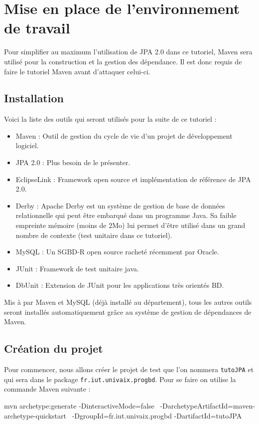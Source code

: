\documentclass[a4paper,11pt]{article}
\begin{document}
\section{Mise en place de l'environnement de travail}
Pour simplifier au maximum l'utilisation de JPA 2.0 dans ce tutoriel, Maven sera utilisé pour la construction et la 
gestion des dépendance. Il est donc requis de faire le tutoriel Maven avant d'attaquer celui-ci.

\subsection{Installation}
Voici la liste des outils qui seront utilisés pour la suite de ce tutoriel : 
\begin{itemize}
\item Maven : Outil de gestion du cycle de vie d'un projet de développement logiciel.
\item JPA 2.0 : Plus besoin de le présenter.
\item EclipseLink : Framework open source et implémentation de référence de JPA 2.0.
\item Derby : Apache Derby est un système de gestion de base de données relationnelle qui peut être embarqué dans un programme Java. 
      Sa faible empreinte mémoire (moins de 2Mo) lui permet d'être utilisé dans un grand nombre de contexte (test unitaire 
      dans ce tutoriel).
\item MySQL : Un SGBD-R open source racheté récemment par Oracle.
\item JUnit : Framework de test unitaire java.
\item DbUnit : Extension de JUnit pour les applications très orientés BD.
\end{itemize}
Mis à par Maven et MySQL (déjà installé au département), tous les autres outils seront installés automatiquement grâce au 
système de gestion de dépendances de Maven.

\subsection{Création du projet}
Pour commencer, nous allons créer le projet de test que l'on nommera \texttt{tutoJPA} et qui sera dans le package 
\texttt{fr.iut.univaix.progbd}. Pour se faire on utilise la commande Maven suivante : 
\begin{code_shell}
mvn archetype:generate -DinteractiveMode=false \
-DarchetypeArtifactId=maven-archetype-quickstart \
-DgroupId=fr.iut.univaix.progbd -DartifactId=tutoJPA
\end{code_shell}
\end{document}
